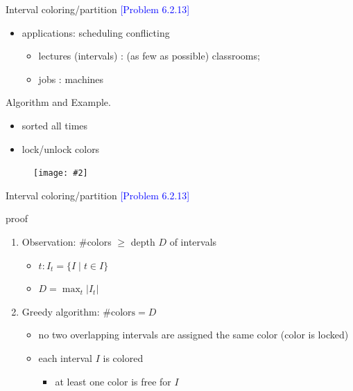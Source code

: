 \documentclass{beamer}
\newcommand{\set}[1]{\{ #1 \}}
\newcommand{\problemno}[1]{\textcolor{blue}{\scriptsize [Problem #1]}}
\newcommand{\fignocaption}[2]
{
  \begin{figure}[htp]
    \centering
      \texttt{[image: \#2]}
  \end{figure}
}
\begin{document}
\begin{frame}{}
  \begin{block}{Interval coloring/partition \problemno{6.2.13}}
    \begin{itemize}
      \item applications: scheduling conflicting
        \begin{itemize}
      	  \item lectures (intervals) : (as few as possible) classrooms;
      	  \item jobs : machines
        \end{itemize}
    \end{itemize}
  \end{block}

  \begin{block}{Algorithm and Example.}
    \begin{itemize}
      \item sorted all times
      \item lock/unlock colors
    \end{itemize}

    \fignocaption{width = 0.60\textwidth}{fig/interval-coloring-example.png}
  \end{block}
\end{frame}
\begin{frame}{}
  \begin{block}{Interval coloring/partition \problemno{6.2.13}}
  \end{block}

  \begin{block}{proof}
    \begin{enumerate}
      \item Observation: \#colors $\geq$ depth $D$ of intervals
		\begin{itemize}
		  \item $t: I_t = \set{I \mid t \in I}$
		  \item $D = \max_{t} |I_t|$
		\end{itemize}
	  \item Greedy algorithm: $\#\textrm{colors} = D$
	    \begin{itemize}
	      \item no two overlapping intervals are assigned the same color (color is
	      locked)
	      \item each interval $I$ is colored
	        \begin{itemize}
	          \item at least one color is free for $I$
	        \end{itemize}
	    \end{itemize}
    \end{enumerate}
  \end{block}
\end{frame}
\end{document}
